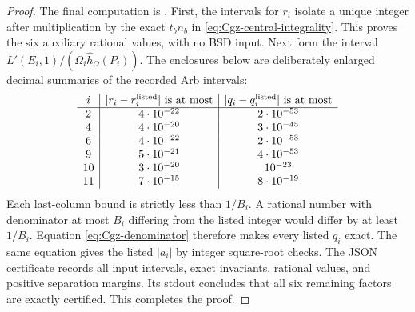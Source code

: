 \begin{proof}
The final computation is
. First, the intervals for
$r_i$ isolate a unique integer after multiplication by the exact
$t_bn_b$ in \eqref{eq:Cgz-central-integrality}. This proves the
six auxiliary rational values, with no BSD input. Next form the
interval $L'(E_i,1)/(\Omega_i\widehat h_O(P_i))$. The enclosures
below are deliberately enlarged decimal summaries of the recorded
Arb intervals:
\[
\begin{array}{c|c|c}
 i&|r_i-r_i^{\rm listed}|\text{ is at most}
   &|q_i-q_i^{\rm listed}|\text{ is at most}\\\hline
 2&4\cdot10^{-22}&2\cdot10^{-53}\\
 4&4\cdot10^{-20}&3\cdot10^{-45}\\
 6&4\cdot10^{-22}&2\cdot10^{-53}\\
 9&5\cdot10^{-21}&4\cdot10^{-53}\\
 10&3\cdot10^{-20}&10^{-23}\\
 11&7\cdot10^{-15}&8\cdot10^{-19}
\end{array}
\]
Each last-column bound is strictly less than $1/B_i$. A rational
number with denominator at most $B_i$ differing from the listed
integer would differ by at least $1/B_i$. Equation
\eqref{eq:Cgz-denominator} therefore makes every listed $q_i$
exact. The same equation gives the listed $|a_i|$ by integer
square-root checks. The JSON certificate records all input
intervals, exact invariants, rational values, and positive separation
margins. Its stdout concludes that all six remaining factors are
exactly certified. This completes the proof.
\end{proof}
